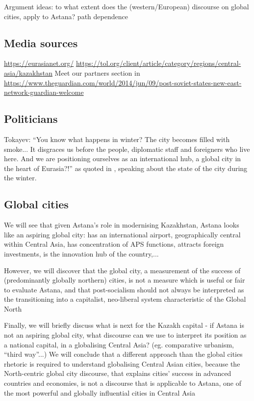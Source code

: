 \documentclass{article}
\begin{document}
Argument ideas: to what extent does the (western/European) discourse on global cities, apply to Astana?
path dependence

\subsection{Media sources}

\begin{outline}
	\1 \url{https://eurasianet.org/}
	\1 \url{https://tol.org/client/article/category/regions/central-asia/kazakhstan}
	\1 Meet our partners section in \url{https://www.theguardian.com/world/2014/jun/09/post-soviet-states-new-east-network-guardian-welcome}
\end{outline}

\subsection{Politicians}

Tokayev: ``You know what happens in winter? The city becomes filled with smoke... It disgraces us before the people, diplomatic staff and foreigners who live here. And we are positioning ourselves as an international hub, a global city in the heart of Eurasia?!'' as quoted in \cite{darkhanumirbekov2019}, speaking about the state of the city during the winter.

\subsection{Global cities}

We will see that given Astana’s role in modernising Kazakhstan, Astana looks like an aspiring global city: has an international airport, geographically central within Central Asia, has concentration of APS functions, attracts foreign investments, is the innovation hub of the country,...

However, we will discover that the global city, a measurement of the success of (predominantly globally northern) cities, is not a measure which is useful or fair to evaluate Astana, and that post-socialism should not always be interpreted as the transitioning into a capitalist, neo-liberal system characteristic of the Global North

Finally, we will briefly discuss what is next for the Kazakh capital - if Astana is not an aspiring global city, what discourse can we use to interpret its position as a national capital, in a globalising Central Asia? (eg. comparative urbanism, “third way”...)
We will conclude that a different approach than the global cities rhetoric is required to understand globalising Central Asian cities, because the North-centric global city discourse, that explains cities’ success in advanced countries and economies, is not a discourse that is applicable to Astana, one of the most powerful and globally influential cities in Central Asia
\end{document}
